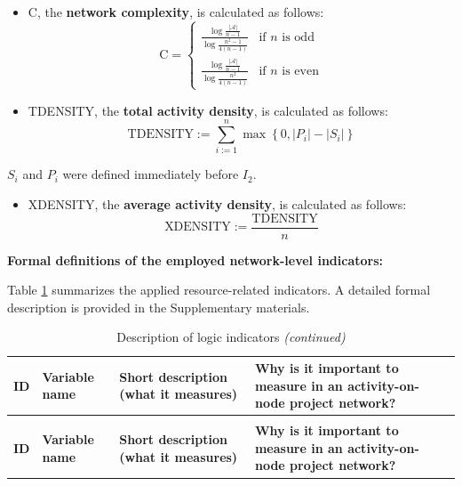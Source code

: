\documentclass[preprint,
3p]{elsarticle} %
\providecommand{\tightlist}{%
  \setlength{\itemsep}{0pt}\setlength{\parskip}{0pt}}
\begin{document}
\begin{appendices}
\begin{itemize}
  OS, the \textbf{order strength}, is calculated as follows:
  \begin{equation}
  \label{eq:OS}
  \text{OS}=\frac{|\mathcal{A}|}{n(n-1)/2}
  \end{equation}
\item
  C, the \textbf{network complexity}, is calculated as follows:
  \begin{equation}
  \label{eq:C}
  \text{C}=\begin{cases} \frac{\log\frac{|\mathcal{A}|}{n-1}}{\log\frac{n^2-1}{4(n-1)}} & \text{if $n$ is odd} \\   \frac{\log\frac{|\mathcal{A}|}{n-1}}{\log\frac{n^2}{4(n-1)}} & \text{if $n$ is even}\end{cases}
  \end{equation}
\item
  TDENSITY, the \textbf{total activity density}, is calculated as
  follows: \begin{equation}
  \label{eq:TDENSITY}
  \text{TDENSITY}:=
  \sum_{i:=1}^n\max \left\{0, |P_i|-|S_i| \right\}
  \end{equation}
\end{itemize}

\noindent  \(S_i\) and \(P_i\) were defined immediately before \(I_2\).

\begin{itemize}
\tightlist
\item
  XDENSITY, the \textbf{average activity density}, is calculated as
  follows: \begin{equation}
  \text{XDENSITY}:=\frac{\text{TDENSITY}}{n}\label{eq:XDENSITY} 
  \end{equation}
\end{itemize}

\textbf{Formal definitions of the employed network-level indicators:}

Table \ref{tab:DESCNETRELIND} summarizes the applied resource-related
indicators. A detailed formal description is provided in the
Supplementary materials.

\begingroup\fontsize{8}{10}\selectfont

\begin{longtable}[t]{l>{\raggedright\arraybackslash}p{2.2cm}>{\raggedright\arraybackslash}p{3.8cm}>{\raggedright\arraybackslash}p{4.2cm}}
\caption{\label{tab:DESCNETRELIND}Description of logic indicators}\\
\toprule
\textbf{ID} & \textbf{Variable name} & \textbf{Short description (what it measures)} & \textbf{Why is it important to measure in an activity-on-node project network?}\\
\midrule
\endfirsthead
\caption[]{Description of logic indicators \textit{(continued)}}\\
\toprule
\textbf{ID} & \textbf{Variable name} & \textbf{Short description (what it measures)} & \textbf{Why is it important to measure in an activity-on-node project network?}\\
\midrule
\endhead


\end{longtable}
\end{appendices}
\end{document}
